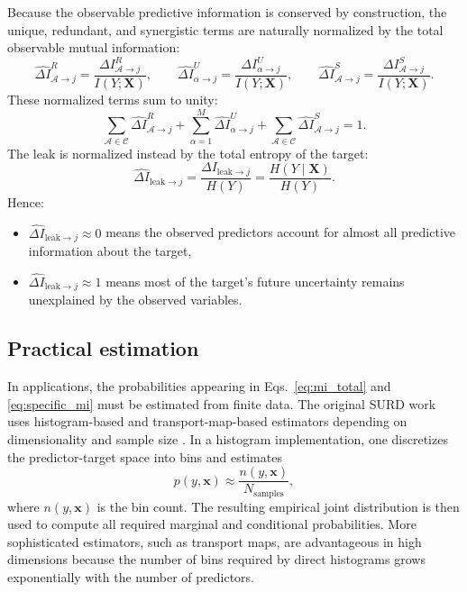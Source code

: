 \documentclass[fleqn,usenatbib]{mnras}
\begin{document}
Because the observable predictive information is conserved by construction, the unique, redundant, and synergistic terms are naturally normalized by the total observable mutual information:
\begin{equation}
\widehat{\Delta I}_{\mathcal{A}\to j}^{R}
=
\frac{\Delta I_{\mathcal{A}\to j}^{R}}{I(Y;\mathbf{X})},
\qquad
\widehat{\Delta I}_{\alpha\to j}^{U}
=
\frac{\Delta I_{\alpha\to j}^{U}}{I(Y;\mathbf{X})},
\qquad
\widehat{\Delta I}_{\mathcal{A}\to j}^{S}
=
\frac{\Delta I_{\mathcal{A}\to j}^{S}}{I(Y;\mathbf{X})}.
\label{eq:normalized_atoms}
\end{equation}
These normalized terms sum to unity:
\begin{equation}
\sum_{\mathcal{A}\in\mathcal{C}}\widehat{\Delta I}_{\mathcal{A}\to j}^{R}
+
\sum_{\alpha=1}^{M}\widehat{\Delta I}_{\alpha\to j}^{U}
+
\sum_{\mathcal{A}\in\mathcal{C}}\widehat{\Delta I}_{\mathcal{A}\to j}^{S}
=1.
\end{equation}
The leak is normalized instead by the total entropy of the target:
\begin{equation}
\widehat{\Delta I}_{\mathrm{leak}\to j}
=
\frac{\Delta I_{\mathrm{leak}\to j}}{H(Y)}
=
\frac{H(Y\mid\mathbf{X})}{H(Y)}.
\label{eq:normalized_leak}
\end{equation}
Hence:
\begin{itemize}
    \item \(\widehat{\Delta I}_{\mathrm{leak}\to j}\approx 0\) means the observed predictors account for almost all predictive information about the target,
    \item \(\widehat{\Delta I}_{\mathrm{leak}\to j}\approx 1\) means most of the target's future uncertainty remains unexplained by the observed variables.
\end{itemize}

\subsection{Practical estimation}

In applications, the probabilities appearing in Eqs.~\eqref{eq:mi_total} and \eqref{eq:specific_mi} must be estimated from finite data. The original SURD work uses histogram-based and transport-map-based estimators depending on dimensionality and sample size \cite{MartinezSanchez2024SURD}. In a histogram implementation, one discretizes the predictor-target space into bins and estimates
\begin{equation}
p(y,\mathbf{x}) \approx \frac{n(y,\mathbf{x})}{N_{\mathrm{samples}}},
\end{equation}
where \(n(y,\mathbf{x})\) is the bin count. The resulting empirical joint distribution is then used to compute all required marginal and conditional probabilities. More sophisticated estimators, such as transport maps, are advantageous in high dimensions because the number of bins required by direct histograms grows exponentially with the number of predictors.
\end{document}
